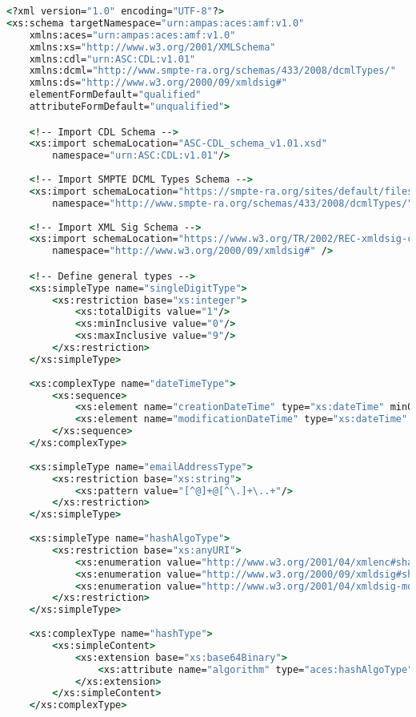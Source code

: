 \label{appendixA}


\begin{lstlisting}[language=csh]
<?xml version="1.0" encoding="UTF-8"?>
<xs:schema targetNamespace="urn:ampas:aces:amf:v1.0"
	xmlns:aces="urn:ampas:aces:amf:v1.0"
	xmlns:xs="http://www.w3.org/2001/XMLSchema"
	xmlns:cdl="urn:ASC:CDL:v1.01" 
	xmlns:dcml="http://www.smpte-ra.org/schemas/433/2008/dcmlTypes/"
	xmlns:ds="http://www.w3.org/2000/09/xmldsig#"
	elementFormDefault="qualified" 
	attributeFormDefault="unqualified">

	<!-- Import CDL Schema -->
	<xs:import schemaLocation="ASC-CDL_schema_v1.01.xsd" 
		namespace="urn:ASC:CDL:v1.01"/>
	
	<!-- Import SMPTE DCML Types Schema -->
	<xs:import schemaLocation="https://smpte-ra.org/sites/default/files/st433b-2008-am1-2011.xsd"
		namespace="http://www.smpte-ra.org/schemas/433/2008/dcmlTypes/" />
	
	<!-- Import XML Sig Schema -->
	<xs:import schemaLocation="https://www.w3.org/TR/2002/REC-xmldsig-core-20020212/xmldsig-core-schema.xsd"
		namespace="http://www.w3.org/2000/09/xmldsig#" />

	<!-- Define general types -->
	<xs:simpleType name="singleDigitType">
		<xs:restriction base="xs:integer">
			<xs:totalDigits value="1"/>
			<xs:minInclusive value="0"/>
			<xs:maxInclusive value="9"/>
		</xs:restriction>
	</xs:simpleType>
	
	<xs:complexType name="dateTimeType">
		<xs:sequence>
			<xs:element name="creationDateTime" type="xs:dateTime" minOccurs="1" maxOccurs="1"/>
			<xs:element name="modificationDateTime" type="xs:dateTime" minOccurs="1" maxOccurs="1"/>
		</xs:sequence>
	</xs:complexType>
	
	<xs:simpleType name="emailAddressType"> 
		<xs:restriction base="xs:string"> 
			<xs:pattern value="[^@]+@[^\.]+\..+"/> 
		</xs:restriction> 
	</xs:simpleType>
	
	<xs:simpleType name="hashAlgoType">
		<xs:restriction base="xs:anyURI">
			<xs:enumeration value="http://www.w3.org/2001/04/xmlenc#sha256"/>
			<xs:enumeration value="http://www.w3.org/2000/09/xmldsig#sha1"/>
			<xs:enumeration value="http://www.w3.org/2001/04/xmldsig-more#md5"/>
		</xs:restriction>
	</xs:simpleType>
	
	<xs:complexType name="hashType">
		<xs:simpleContent>
			<xs:extension base="xs:base64Binary">
				<xs:attribute name="algorithm" type="aces:hashAlgoType" use="required"/>
			</xs:extension>
		</xs:simpleContent>
	</xs:complexType>


\end{lstlisting}
